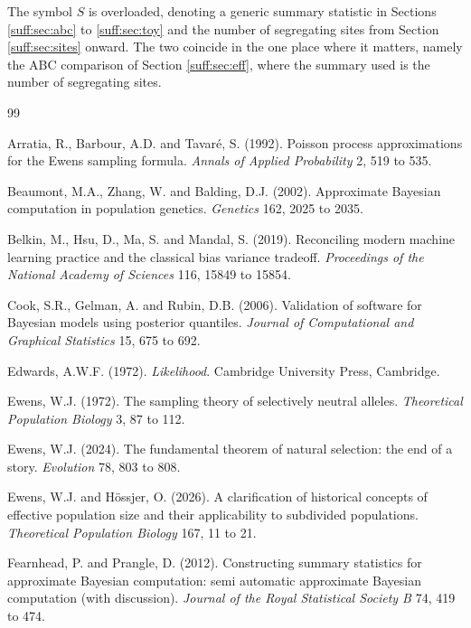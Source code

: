 \medskip
The symbol $S$ is overloaded, denoting a generic summary statistic in Sections
\ref{suff:sec:abc} to \ref{suff:sec:toy} and the number of segregating sites from Section
\ref{suff:sec:sites} onward. The two coincide in the one place where it matters, namely the
ABC comparison of Section \ref{suff:sec:eff}, where the summary used is the number of
segregating sites.

\begin{thebibliography}{99}

Arratia, R., Barbour, A.D. and Tavar\'e, S. (1992). Poisson process approximations for the
Ewens sampling formula. \emph{Annals of Applied Probability} 2, 519 to 535.

Beaumont, M.A., Zhang, W. and Balding, D.J. (2002). Approximate Bayesian computation in
population genetics. \emph{Genetics} 162, 2025 to 2035.

Belkin, M., Hsu, D., Ma, S. and Mandal, S. (2019). Reconciling modern machine learning
practice and the classical bias variance tradeoff. \emph{Proceedings of the National Academy
of Sciences} 116, 15849 to 15854.

Cook, S.R., Gelman, A. and Rubin, D.B. (2006). Validation of software for Bayesian models
using posterior quantiles. \emph{Journal of Computational and Graphical Statistics} 15, 675
to 692.

Edwards, A.W.F. (1972). \emph{Likelihood}. Cambridge University Press, Cambridge.

Ewens, W.J. (1972). The sampling theory of selectively neutral alleles.
\emph{Theoretical Population Biology} 3, 87 to 112.

Ewens, W.J. (2024). The fundamental theorem of natural selection: the end of a story.
\emph{Evolution} 78, 803 to 808.

Ewens, W.J. and H\"ossjer, O. (2026). A clarification of historical concepts of effective
population size and their applicability to subdivided populations. \emph{Theoretical Population
Biology} 167, 11 to 21.

Fearnhead, P. and Prangle, D. (2012). Constructing summary statistics for approximate Bayesian
computation: semi automatic approximate Bayesian computation (with discussion). \emph{Journal
of the Royal Statistical Society B} 74, 419 to 474.


\end{thebibliography}
